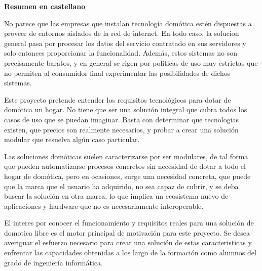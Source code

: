 
\newpage

\thispagestyle{empty}

\begin{center}

{\bf \Huge Resumen en castellano}

  \end{center}
\vspace{1cm}

No parece que las empresas que instalan tecnología domótica estén dispuestas a proveer de entornos aislados de la red de internet. En todo caso, la solucion general pasa por procesar los datos del servicio contratado en sus servidores y solo entonces proporcionar la funcionalidad. Además, estos sistemas no son precisamente baratos, y en general se rigen por políticas de uso muy estrictas que no permiten al consumidor final experimentar las posibilidades de dichos sistemas.

\vspace{0.5cm}

Este proyecto pretende entender los requisitos tecnológicos para dotar de domótica un hogar. No tiene que ser una solución integral que cubra todos los casos de uso que se puedan imaginar. Basta con determinar que tecnologias existen, que precios son realmente necesarios, y probar a crear una solución modular que resuelva algún caso particular.

\vspace{0.5cm}

Las soluciones domóticas suelen caracterizarse por ser modulares, de tal forma que pueden automatizarse procesos concretos sin necesidad de dotar a todo el hogar de domótica, pero en ocasiones, surge una necesidad concreta, que puede que la marca que el usuario ha adquirido, no sea capaz de cubrir, y se deba buscar la solución en otra marca, lo que implica un ecosistema nuevo de aplicaciones y hardware que no es necesariamente interoperable.

\vspace{0.5cm}

El interes por conocer el funcionamiento y requisitos reales para una solución de domotica libre es el motor principal de motivación para este proyecto. Se desea averiguar el esfuerzo necesario para crear una solución de estas caracteristicas y enfrentar las capacidades obtenidas a los largo de la formación como alumnos del grado de ingeniería informática.

